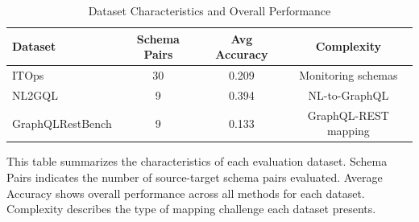 
\begin{table}[htbp]
\centering
\caption{Dataset Characteristics and Overall Performance}
\label{tab:dataset_analysis}
\begin{tabular}{lccc}
\toprule
\textbf{Dataset} & \textbf{Schema Pairs} & \textbf{Avg Accuracy} & \textbf{Complexity} \\
\midrule
ITOps & 30 & 0.209 & Monitoring schemas \\
NL2GQL & 9 & 0.394 & NL-to-GraphQL \\
GraphQLRestBench & 9 & 0.133 & GraphQL-REST mapping \\
\bottomrule
\end{tabular}
\end{table}

This table summarizes the characteristics of each evaluation dataset. Schema Pairs indicates the number of source-target schema pairs evaluated. Average Accuracy shows overall performance across all methods for each dataset. Complexity describes the type of mapping challenge each dataset presents.

